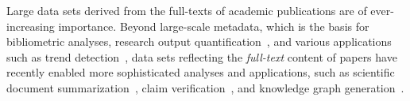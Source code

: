 



Large data sets derived from the full-texts of academic publications are of ever-increasing importance. Beyond large-scale metadata, which is the basis for bibliometric analyses, research output quantification~\cite{Hirsch2005}, and various applications such as trend detection~\cite{Chen2006}, data sets reflecting the \emph{full-text} content of papers have recently enabled more sophisticated analyses and applications, such as scientific document summarization~\cite{citesum}, claim verification~\cite{wadden2020}, and knowledge graph generation~\cite{luan2018scierc}.

